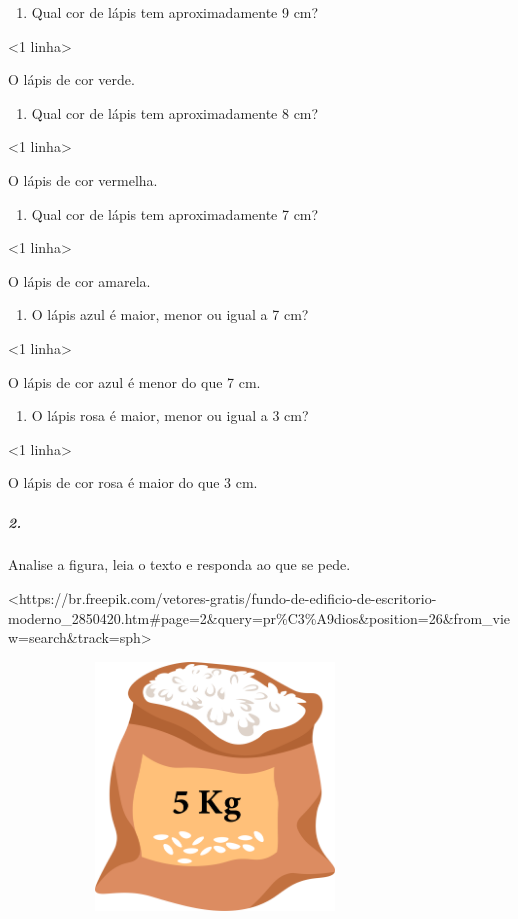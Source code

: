 \begin{enumerate}
\def\labelenumi{\alph{enumi})}
\item
  Qual cor de lápis tem aproximadamente 9 cm?
\end{enumerate}

\textless{}1 linha\textgreater{}

O lápis de cor verde.

\begin{enumerate}
\def\labelenumi{\alph{enumi})}
\item
  Qual cor de lápis tem aproximadamente 8 cm?
\end{enumerate}

\textless{}1 linha\textgreater{}

O lápis de cor vermelha.

\begin{enumerate}
\def\labelenumi{\alph{enumi})}
\item
  Qual cor de lápis tem aproximadamente 7 cm?
\end{enumerate}

\textless{}1 linha\textgreater{}

O lápis de cor amarela.

\begin{enumerate}
\def\labelenumi{\alph{enumi})}
\item
  O lápis azul é maior, menor ou igual a 7 cm?
\end{enumerate}

\textless{}1 linha\textgreater{}

O lápis de cor azul é menor do que 7 cm.

\begin{enumerate}
\def\labelenumi{\alph{enumi})}
\item
  O lápis rosa é maior, menor ou igual a 3 cm?
\end{enumerate}

\textless{}1 linha\textgreater{}

O lápis de cor rosa é maior do que 3 cm.

\subparagraph{2.}\label{section-29}

Analise a figura, leia o texto e responda ao que se pede.

\textless{}https://br.freepik.com/vetores-gratis/fundo-de-edificio-de-escritorio-moderno\_2850420.htm\#page=2\&query=pr\%C3\%A9dios\&position=26\&from\_view=search\&track=sph\textgreater{}

\includegraphics[width=4.31250in,height=2.59651in]{media/image43.png}


